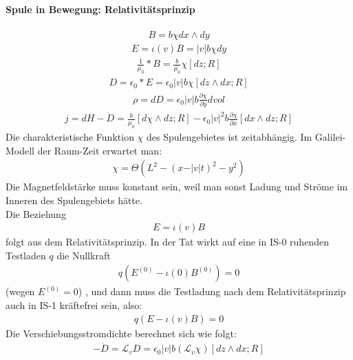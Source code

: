 \documentclass[10pt,a4paper]{article}
\begin{document}
\paragraph{Spule in Bewegung: Relativitätsprinzip} $ \,$ \\
\begin{align}
B= b \chi dx \wedge dy
\end{align}
\begin{align}
E= \iota  (v) B = \vert v \vert b \chi dy
\end{align}
\begin{align}
\frac{1}{\mu_0} * B = \frac{b}{\mu_0} \chi [dz;R]
\end{align}
\begin{align}
D= \epsilon_0 * E = \epsilon_0 \vert v \vert b \chi [dz \wedge dx ;R]
\end{align}
\begin{align}
\rho= dD= \epsilon_0 \vert v \vert b \frac{\partial \chi}{\partial y} dvol
\end{align}
\begin{align}
j= dH-\dot{D}= \frac{b}{\mu_0} [d \chi \wedge dz ;R] - \epsilon_0 \vert v \vert^2 b \frac{\partial \chi}{\partial x} [ dx \wedge dz ;R]
\end{align}
Die charakteristische Funktion $ \chi$ des Spulengebietes ist zeitabhängig. Im Galilei-Modell der Raum-Zeit erwartet man:
\begin{align}
\chi= \Theta (L^2-(x-\vert v \vert t )^2 -y^2)
\end{align}
Die Magnetfeldstärke muss konstant sein, weil man sonst Ladung und Ströme im Inneren des Spulengebiets hätte.\\
Die Beziehung 
\begin{align}
E= \iota (v) B
\end{align}
folgt aus dem Relativitätsprinzip. In der Tat wirkt auf eine in IS-0 ruhenden Testladen $q$ die Nullkraft
\begin{align}
q (E^{(0)} - \iota (0) B^{(0)}) =0
\end{align}
(wegen $E^{(0)} =0 $) , und dann muss die Testladung nach dem Relativitätsprinzip auch in IS-1 kräftefrei sein, also:
\begin{align}
q(E- \iota (v) B)=0
\end{align}
Die Verschiebungsstromdichte berechnet sich wie folgt:
\begin{align}
-\dot{D}= \mathcal{L}_v D = \epsilon_0 \vert v \vert b (\mathcal{L}_v \chi) [dz \wedge dx ; R]
\end{align}
\end{document}
